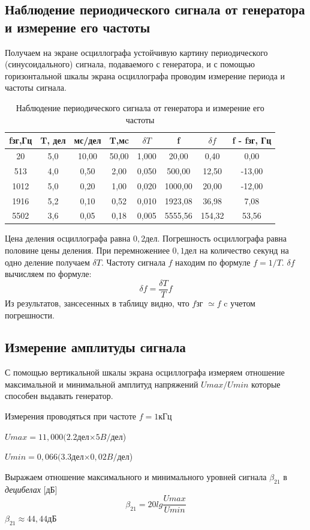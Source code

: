 \documentclass[a4paper,12pt]{article} %
\begin{document}
\subsection{Наблюдение периодического сигнала от генератора и измерение его частоты}
Получаем на экране осциллографа устойчивую картину периодического (синусоидального) сигнала, подаваемого с генератора, и с помощью горизонтальной шкалы экрана осциллографа проводим измерение периода и частоты сигнала.
\begin{center}
\begin{table}[!h]
\begin{tabular}{|c|c|c|c|c|c|c|c|}
\hline
fзг,Гц & T, дел & мс/дел   & T,мc  &$\delta T$ & f  &$\delta f$ & f - fзг, Гц \\ \hline
20     & 5,0   & 10,00 & 50,00 & 1,000  & 20,00   &   0,40    & 0,00        \\ \hline
513    & 4,0   & 0,50 & 2,00  & 0,050 & 500,00  &     12,50   & -13,00      \\ \hline
1012   & 5,0   & 0,20 & 1,00  & 0,020& 1000,00 &    20,00    & -12,00      \\ \hline
1916   & 5,2   & 0,10 & 0,52 & 0,010& 1923,08 &     36,98   & 7,08        \\ \hline
5502   & 3,6   & 0,05 & 0,18 & 0,005& 5555,56 &   154,32     & 53,56       \\ \hline
\end{tabular}
\caption{Наблюдение периодического сигнала от генератора и измерение его частоты}
\end{table}
\end{center}
Цена деления осциллографа равна $0,2$дел. Погрешность осциллографа равна половине цены деления. При перемножениее $0,1$дел на количество секунд на одно деление получаем $\delta T$. 
Частоту сигнала $f$ находим по формуле $f = 1/T$. $\delta f$ вычисляем по формуле:
\[\delta f = \frac{\delta T}{T}f\]
Из результатов, зансесенных в таблицу видно, что $f$зг $\simeq f$ c учетом погрешности. 
\subsection{Измерение амплитуды сигнала}
\hfuzz=2.5pt
С помощью вертикальной шкалы экрана осциллографа измеряем отношение максимальной и минимальной амплитуд напряжений $Umax/Umin$ которые способен выдавать генератор.
{

}

Измерения проводяться при частоте $f = 1$кГц
{\raggedright

}
$Umax = 11,000 (2.2$дел$\times  5B/$дел)
{\raggedright

}
$Umin = 0,066 (3.3$дел$\times  0,02B/$дел)
{\raggedright

}
Выражаем отношение максимального и минимального уровней сигнала $\beta_{21}$ в \textit{децибелах} [дБ]
\[ \beta_{21} = 20 lg{\frac{Umax}{Umin}}\]
$\beta_{21} \approx 44,44$дБ
\end{document}
